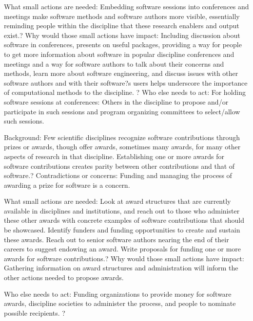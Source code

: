 \documentclass[a4paper,UKenglish]{dagman}
\begin{document}
What small actions are needed: Embedding software sessions into conferences and meetings make software methods and software authors more visible, essentially reminding people within the discipline that these research enablers and output exist.?
Why would those small actions have impact: Including discussion about software in conferences, presents on useful packages, providing a way for people to get more information about software in popular discipline conferences and meetings and a way for software authors to talk about their concerns and methods, learn more about software engineering, and discuss issues with other software authors and with their software?s users helps underscore the importance of computational methods to the discipline. ?
Who else needs to act: For holding software sessions at conferences: Others in the discipline to propose and/or participate in such sessions and program organizing committees to select/allow such sessions. 


 Background: Few scientific disciplines recognize software contributions through prizes or awards, though offer awards, sometimes many awards, for many other aspects of research in that discipline. Establishing one or more awards for software contributions creates parity between other contributions and that of software.?
Contradictions or concerns: Funding and managing the process of awarding a prize for software is a concern. 

What small actions are needed: Look at award structures that are currently available in disciplines and institutions, and reach out to those who administer these other awards with concrete examples of software contributions that should be showcased. Identify funders and funding opportunities to create and sustain these awards. Reach out to senior software authors nearing the end of their careers to suggest endowing an award. Write proposals for funding one or more awards for software contributions.?
Why would those small actions have impact: Gathering information on award structures and administration will inform the other actions needed to propose awards.

Who else needs to act: Funding organizations to provide money for software awards, discipline societies to administer the process, and people to nominate possible recipients. 
?
\end{document}

